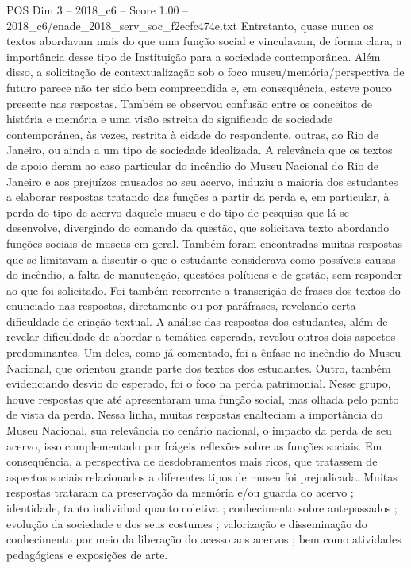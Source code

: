 \begin{textsample}{POS Dim 3 – 2018\_c6 – Score 1.00 – 2018\_c6/enade\_2018\_serv\_soc\_f2ecfc474e.txt}
Entretanto, quase nunca os textos abordavam mais do que uma função social e vinculavam, de forma clara, a importância desse tipo de Instituição para a sociedade contemporânea.
Além disso, a solicitação de contextualização sob o foco museu/memória/perspectiva de futuro parece não ter sido bem compreendida e, em consequência, esteve pouco presente nas respostas.
Também se observou confusão entre os conceitos de história e memória e uma visão estreita do significado de sociedade contemporânea, às vezes, restrita à cidade do respondente, outras, ao Rio de Janeiro, ou ainda a um tipo de sociedade idealizada.
A relevância que os textos de apoio deram ao caso particular do incêndio do Museu Nacional do Rio de Janeiro e aos prejuízos causados ao seu acervo, induziu a maioria dos estudantes a elaborar respostas tratando das funções a partir da perda e, em particular, à perda do tipo de acervo daquele museu e do tipo de pesquisa que lá se desenvolve, divergindo do comando da questão, que solicitava texto abordando funções sociais de museus em geral.
Também foram encontradas muitas respostas que se limitavam a discutir o que o estudante considerava como possíveis causas do incêndio, a falta de manutenção, questões políticas e de gestão, sem responder ao que foi solicitado.
Foi também recorrente a transcrição de frases dos textos do enunciado nas respostas, diretamente ou por paráfrases, revelando certa dificuldade de criação textual.
A análise das respostas dos estudantes, além de revelar dificuldade de abordar a temática esperada, revelou outros dois aspectos predominantes.
Um deles, como já comentado, foi a ênfase no incêndio do Museu Nacional, que orientou grande parte dos textos dos estudantes.
Outro, também evidenciando desvio do esperado, foi o foco na perda patrimonial.
Nesse grupo, houve respostas que até apresentaram uma função social, mas olhada pelo ponto de vista da perda.
Nessa linha, muitas respostas enalteciam a importância do Museu Nacional, sua relevância no cenário nacional, o impacto da perda de seu acervo, isso complementado por frágeis reflexões sobre as funções sociais.
Em consequência, a perspectiva de desdobramentos mais ricos, que tratassem de aspectos sociais relacionados a diferentes tipos de museu foi prejudicada.
Muitas respostas trataram da preservação da memória e/ou guarda do acervo ; identidade, tanto individual quanto coletiva ; conhecimento sobre antepassados ; evolução da sociedade e dos seus costumes ; valorização e disseminação do conhecimento por meio da liberação do acesso aos acervos ; bem como atividades pedagógicas e exposições de arte.

\end{textsample}

